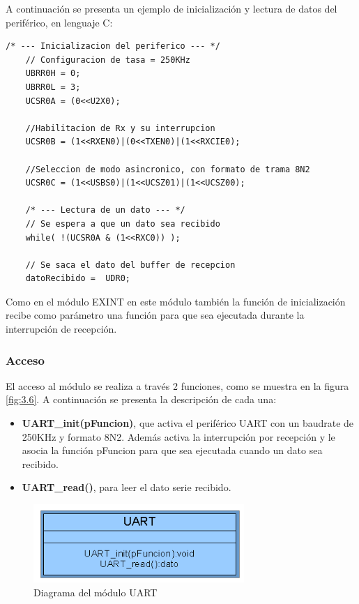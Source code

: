 A continuación se presenta un ejemplo de inicialización y lectura de datos del periférico, en lenguaje C: 

\begin{lstlisting}[style=CStyle]
	/* --- Inicializacion del periferico --- */
	// Configuracion de tasa = 250KHz
	UBRR0H = 0;
	UBRR0L = 3;
	UCSR0A = (0<<U2X0);
	
	//Habilitacion de Rx y su interrupcion
	UCSR0B = (1<<RXEN0)|(0<<TXEN0)|(1<<RXCIE0); 
	
	//Seleccion de modo asincronico, con formato de trama 8N2
	UCSR0C = (1<<USBS0)|(1<<UCSZ01)|(1<<UCSZ00); 

	/* --- Lectura de un dato --- */
	// Se espera a que un dato sea recibido
	while( !(UCSR0A & (1<<RXC0)) ); 
	
	// Se saca el dato del buffer de recepcion
	datoRecibido =  UDR0;
\end{lstlisting}

Como en el módulo EXINT en este módulo también la función de inicialización recibe como parámetro una función para que sea ejecutada durante la interrupción de recepción.


\subsubsection{Acceso}
El acceso al módulo se realiza a través 2 funciones, como se muestra en la figura \ref{fig:3.6}. A continuación se presenta la descripción de cada una:
\begin{itemize}
	\item \textbf{UART\_init(pFuncion)}, que activa el periférico UART con un baudrate de 250KHz y formato 8N2. Además activa la interrupción por recepción y le asocia la función pFuncion para que sea ejecutada cuando un dato sea recibido.
	\item \textbf{UART\_read()}, para leer el dato serie recibido.
\end{itemize}

\begin{figure}[!ht]
	\centering
	\includegraphics[width=8cm,scale=1]{resources/3_6-moduloUART.png}
	\caption{Diagrama del módulo UART}
	\label{fig:\thefigure}
\end{figure}

